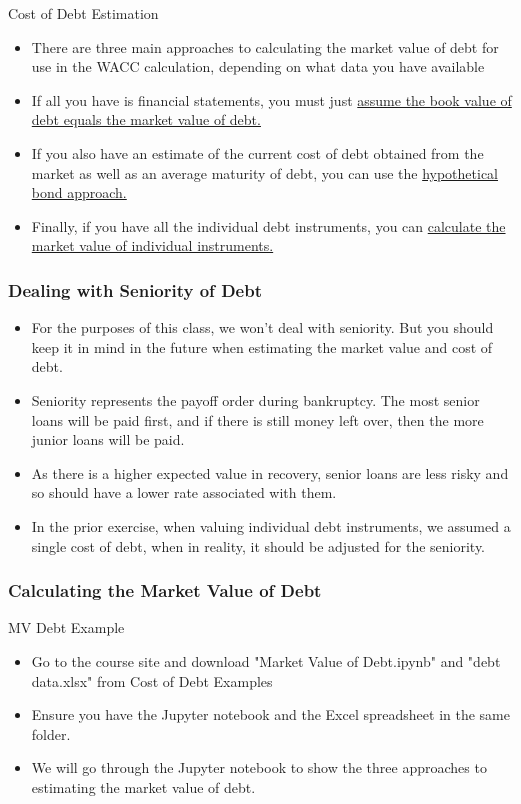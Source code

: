 \documentclass[handout, 11pt]{beamer}
\begin{document}
\begin{section}[Debt]{Cost of Debt Estimation}
\begin{frame}
\begin{itemize}
\item There are three main approaches to calculating the market value of debt for use in the WACC calculation, depending on what data you have available
\vfill
\item If all you have is financial statements, you must just
\underline{assume the book value of debt equals the market value of debt.}
\vfill
\item If you also have an estimate of the current cost of debt obtained from the market as well as an average maturity of debt, you can use the
\underline{hypothetical bond approach.}
\vfill
\item Finally, if you have all the individual debt instruments, you can
\underline{calculate the market value of individual instruments.}
\end{itemize}
\end{frame}
\begin{frame}
\frametitle{Dealing with Seniority of Debt}
\begin{itemize}
\item For the purposes of this class, we won't deal with seniority. But you should keep it in mind in the future when estimating the market value and cost of debt.
\vfill
\item Seniority represents the payoff order during bankruptcy. The most senior loans will be paid first, and if there is still money left over, then the more junior loans will be paid.
\vfill
\item As there is a higher expected value in recovery, senior loans are less risky and so should have a lower rate associated with them.
\vfill
\item In the prior exercise, when valuing individual debt instruments, we assumed a single cost of debt, when in reality, it should be adjusted for the seniority.
\end{itemize}
\end{frame}
\begin{frame}
\frametitle{Calculating the Market Value of Debt}
{
\begin{block}{MV Debt Example}
\begin{itemize}
\item Go to the course site and download "Market Value of Debt.ipynb" and "debt data.xlsx" from Cost of Debt Examples
\item Ensure you have the Jupyter notebook and the Excel spreadsheet in the same folder.
\item We will go through the Jupyter notebook to show the three approaches to estimating the market value of debt.
\end{itemize}
\end{block}
}
\end{frame}
\end{section}
\end{document}
